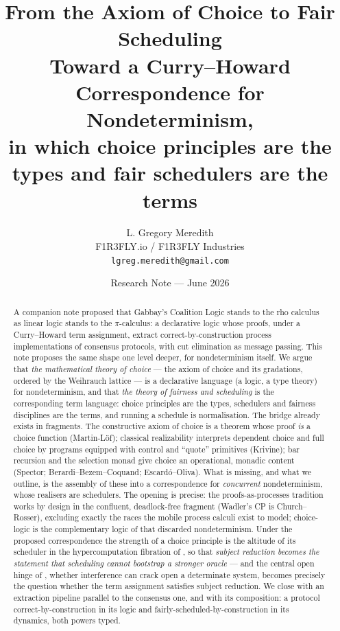 \documentclass[11pt]{article}
\title{\bfseries From the Axiom of Choice to Fair Scheduling\\[3pt]
\large Toward a Curry--Howard Correspondence for Nondeterminism,\\
in which choice principles are the types and fair schedulers are the terms}
\author{L. Gregory Meredith\\
\small F1R3FLY.io / F1R3FLY Industries\\
\small \texttt{lgreg.meredith@gmail.com}}
\date{Research Note --- June 2026}
\theoremstyle{definition}
\theoremstyle{plain}
\theoremstyle{remark}
\begin{document}
\maketitle

\begin{abstract}
A companion note \cite{consensus} proposed that Gabbay's Coalition Logic stands to the
rho calculus as linear logic stands to the $\pi$-calculus: a declarative logic whose
proofs, under a Curry--Howard term assignment, extract correct-by-construction process
implementations of consensus protocols, with cut elimination as message passing. This
note proposes the same shape one level deeper, for nondeterminism itself. We argue that
\emph{the mathematical theory of choice} --- the axiom of choice and its gradations,
ordered by the Weihrauch lattice --- is a declarative language (a logic, a type theory)
for nondeterminism, and that \emph{the theory of fairness and scheduling} is the
corresponding term language: choice principles are the types, schedulers and fairness
disciplines are the terms, and running a schedule is normalisation. The bridge already
exists in fragments. The constructive axiom of choice is a theorem whose proof
\emph{is} a choice function (Martin-L\"of); classical realizability interprets dependent
choice and full choice by programs equipped with control and ``quote'' primitives
(Krivine); bar recursion and the selection monad give choice an operational, monadic
content (Spector; Berardi--Bezem--Coquand; Escard\'o--Oliva). What is missing, and what
we outline, is the assembly of these into a correspondence for \emph{concurrent}
nondeterminism, whose realisers are schedulers. The opening is precise: the
proofs-as-processes tradition works by design in the confluent, deadlock-free fragment
(Wadler's CP is Church--Rosser), excluding exactly the races the mobile process calculi
exist to model; choice-logic is the complementary logic of that discarded
nondeterminism. Under the proposed correspondence the strength of a choice principle is
the altitude of its scheduler in the hypercomputation fibration of \cite{agency}, so
that \emph{subject reduction becomes the statement that scheduling cannot bootstrap a
stronger oracle} --- and the central open hinge of \cite{agency}, whether interference
can crack open a determinate system, becomes precisely the question whether the term
assignment satisfies subject reduction. We close with an extraction pipeline parallel to
the consensus one, and with its composition: a protocol correct-by-construction in its
logic and fairly-scheduled-by-construction in its dynamics, both powers typed.
\end{abstract}
\end{document}
